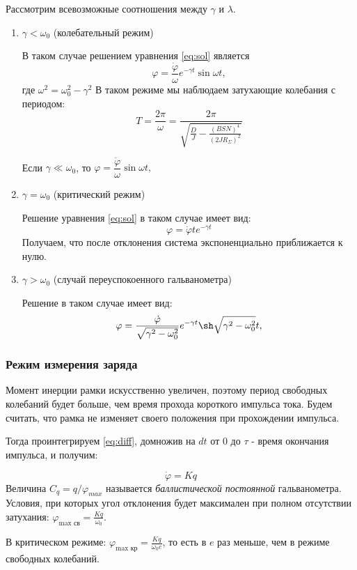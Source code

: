 \documentclass[a4paper, 12pt]{article}
\begin{document}
Рассмотрим всевозможные соотношения между $\gamma$ и $\lambda$.

\begin{enumerate}

\item $\gamma < \omega_0$ (колебательный режим)

В таком случае решением уравнения \ref{eq:sol} является 
$$ \varphi = \dfrac{\dot{\varphi}}{\omega}e^{-\gamma t} \sin \omega t,$$
где $\omega^2 = \omega^2_0 - \gamma^2$
В таком режиме мы наблюдаем затухающие колебания с периодом:
$$T = \dfrac{2\pi}{\omega} = \dfrac{2 \pi}{\sqrt{\frac{D}{J} - \frac{(BSN)^4}{(2JR_\Sigma)^2}}}$$

Если $\gamma \ll \omega_0$, то $ \varphi = \dfrac{\dot{\varphi}}{\omega} \sin \omega t,$

\item $\gamma = \omega_0$ (критический режим)

Решение уравнения \ref{eq:sol} в таком случае имеет вид:
$$\varphi = \dot{\varphi	}te^{-\gamma   t}$$
Получаем, что после отклонения система экспоненциально приближается к нулю.

\item $\gamma > \omega_0$ (случай переуспокоенного гальванометра)

Решение в таком случае имеет вид:
$$ \varphi = \dfrac{\dot{\varphi}}{\sqrt{\gamma^2 - \omega_0^2}}e^{-\gamma t} \sh\sqrt{\gamma^2 - \omega_0^2}  t,$$
\end{enumerate}

\subsubsection*{Режим измерения заряда}

Момент инерции рамки искусственно увеличен, поэтому период свободных колебаний будет больше, чем время прохода короткого импульса тока. Будем считать, что рамка не изменяет своего положения при прохождении импульса.

Тогда проинтегрируем \ref{eq:diff}, домножив на $dt$ от $0$ до $\tau$ - время окончания импульса,  и получим:

$$\dot{\varphi} = K q$$
Величина $C_q = q/\varphi_{max}$ называется \textit{баллистической постоянной} гальванометра. Условия, при которых угол отклонения будет максимален при полном отсутствии затухания: $\varphi_\text{max св} = \frac{Kq}{\omega_0}$. 

В критическом режиме: 
$\varphi_\text{max кр} = \frac{Kq}{\omega_0e}$, то есть в $e$ раз меньше, чем в режиме свободных колебаний.
\end{document}
